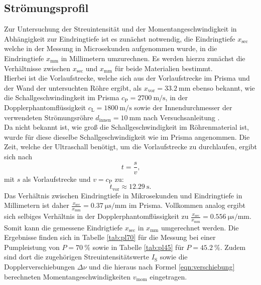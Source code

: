 \FloatBarrier
\subsection{Strömungsprofil}
Zur Untersuchung der Streuintensität und der Momentangeschwindigkeit in Abhängigkeit zur Eindringtiefe ist es zunächst notwendig, die Eindringtiefe $x_{\mathrm{sec}}$ welche in der Messung in Microsekunden aufgenommen wurde, in die Eindringtiefe $x_{\mathrm{mm}}$ in Millimetern umzurechnen.
Es werden hierzu zunächst die Verhältnisse zwischen $x_{\mathrm{sec}}$ und $x_{\mathrm{mm}}$ für beide Materialien bestimmt.\\
Hierbei ist die Vorlaufstrecke, welche sich aus der Vorlaufstrecke im Prisma und der Wand der untersuchten Röhre ergibt, als $x_\mathrm{vor}=\SI{33.2}{\milli\meter}$ ebenso bekannt, wie die Schallgeschwindingkeit im Prisma $c_\mathrm{P}=\SI{2700}{\meter\per\second}$, in der Dopplerphantomflüssigkeit $c_\mathrm{L}=\SI{1800}{\meter\per\second}$ sowie der Innendurchmesser der verwendeten Strömungsröhre $d_\mathrm{innen}=\SI{10}{\milli\meter}$ nach Versuchsanleitung \cite{Anleitung}.\\
Da nicht bekannt ist, wie groß die Schallgeschwindigkeit im Röhrenmaterial ist, wurde für diese dieselbe Schallgeschwindigkeit wie im Prisma angenommen.
Die Zeit, welche der Ultraschall benötigt, um die Vorlaufstrecke zu durchlaufen, ergibt sich nach
\begin{equation*}
  t=\frac{s}{v} \text{,}
\end{equation*}
mit $s$ als Vorlaufstrecke und $v=c_\mathrm{P}$ zu:
\begin{equation*}
    t_\mathrm{vor}\approx\SI{12.29}{\second}\text{.}
\end{equation*}
Das Verhältnis zwischen Eindringtiefe in Mikrosekunden und Eindringtiefe in Millimetern ist daher $\frac{x_\mathrm{sec}}{x_\mathrm{mm}}=\SI{0.37}{\micro\second\per\milli\meter}$ im Prisma. Vollkommen analog ergibt sich selbiges Verhältnis in der Dopplerphantomflüssigkeit zu $\frac{x_\mathrm{sec}}{x_\mathrm{mm}}=\SI{0.556}{\micro\second\per\milli\meter}$.
\\Somit kann die gemessene Eindrigtiefe $x_\mathrm{sec}$ in $x_\mathrm{mm}$ umgerechnet werden. Die Ergebnisse finden sich in Tabelle \ref{tab:pl70} für die Messung bei einer Pumpleistung von $P=\SI{70}{\percent}$ sowie in Tabelle  \ref{tab:pl45} für $P=\SI{45.2}{\percent}$.
Zudem sind dort die zugehörigen Streuintensitätswerte $I_\mathrm{S}$ sowie die Dopplerverschiebungen $\Delta \nu$ und die hieraus nach Formel \eqref{eqn:verschiebung} berechneten Momentangeschwindigkeiten $v_\mathrm{mom}$ eingetragen.

